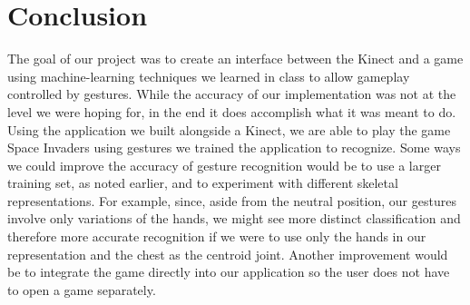 \documentclass[11pt,conference]{IEEEtran}
\begin{document}
\section{Conclusion}
The goal of our project was to create an interface between the Kinect and a game using machine-learning techniques we learned in class to allow gameplay controlled by gestures. While the accuracy of our implementation was not at the level we were hoping for, in the end it does accomplish what it was meant to do. Using the application we built alongside a Kinect, we are able to play the game Space Invaders using gestures we trained the application to recognize. Some ways we could improve the accuracy of gesture recognition would be to use a larger training set, as noted earlier, and to experiment with different skeletal representations. For example, since, aside from the neutral position, our gestures involve only variations of the hands, we might see more distinct classification and therefore more accurate recognition if we were to use only the hands in our representation and the chest as the centroid joint. Another improvement would be to integrate the game directly into our application so the user does not have to open a game separately.
\end{document}
